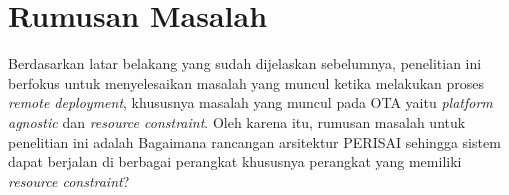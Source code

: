 \section{Rumusan Masalah}

Berdasarkan latar belakang yang sudah dijelaskan sebelumnya, penelitian ini berfokus untuk menyelesaikan masalah yang muncul ketika melakukan proses \textit{remote deployment}, khususnya masalah yang muncul pada OTA yaitu \textit{platform agnostic} dan \textit{resource constraint}. Oleh karena itu, rumusan masalah untuk penelitian ini adalah Bagaimana rancangan arsitektur PERISAI sehingga sistem dapat berjalan di berbagai perangkat khususnya perangkat yang memiliki \textit{resource constraint}?